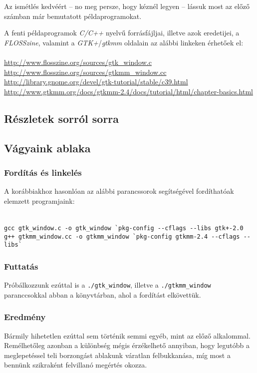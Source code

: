 Az ismétlés kedvéért -- no meg persze, hogy kéznél legyen -- lássuk most az előző számban már bemutatott példaprogramokat.


A fenti példaprogramok \textit{C/C++} nyelvű forrásfájljai, illetve azok eredetijei, a \textit{FLOSSzine}, valamint a \textit{GTK+}/\textit{gtkmm} oldalain az alábbi linkeken érhetőek el:
\ \\\\
\url{http://www.flosszine.org/sources/gtk_window.c}\\
\url{http://www.flosszine.org/sources/gtkmm_window.cc}\\
\url{http://library.gnome.org/devel/gtk-tutorial/stable/c39.html}\\
\url{http://www.gtkmm.org/docs/gtkmm-2.4/docs/tutorial/html/chapter-basics.html}

\subsection{Részletek sorról sorra}

\subsection{Vágyaink ablaka}

\subsubsection{Fordítás és linkelés}

A korábbiakhoz hasonlóan az alábbi parancssorok segítségével fordíthatóak e\-lem\-zett programjaink:

\fontsize{8pt}{8pt}
\ \\
\texttt{gcc gtk\_window.c -o gtk\_window \`{}pkg-config {-}-cflags {-}-libs gtk+-2.0}
\ \\
\texttt{g++ gtkmm\_window.cc -o gtkmm\_window \`{}pkg-config gtkmm-2.4 {-}-cflags {-}-libs\`{}}

\subsubsection{Futtatás}

Próbálkozzunk ezúttal is a \texttt{./gtk\_window}, illetve a \texttt{./gtkmm\_window} paranccsokkal abban a könyvtárban, ahol a fordítást elkövettük.

\subsubsection{Eredmény}

Bármily hihetetlen ezúttal sem történik semmi egyéb, mint az előző alkalommal. Remélhetőleg azonban a különbség mégis érzékelhető annyiban, hogy legutóbb a meglepetéssel teli borzongást ablakunk váratlan felbukkanása, míg most a bennünk szikraként felvillanó megértés okozza.

 
